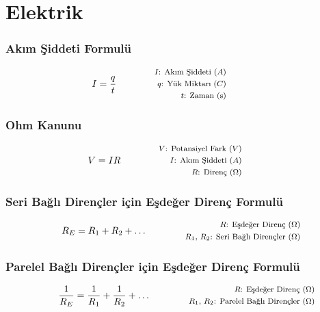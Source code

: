 \section{Elektrik}

\subsubsection*{Akım Şiddeti Formulü}
\begin{equation}
    I = \frac{q}{t} \qquad \qquad \parbox{4cm}{\footnotesize$\begin{aligned}
        I\text{: Akım Şiddeti } (A) \\
        q\text{: Yük Miktarı } (C) \\
        t\text{: Zaman (s)}
\end{aligned}$}
\end{equation}

\subsubsection*{Ohm Kanunu}
\begin{equation}
    V = IR \qquad \qquad \parbox{4cm}{\footnotesize$\begin{aligned}
        V\text{: Potansiyel Fark } (V) \\
        I\text{: Akım Şiddeti } (A) \\
        R\text{: Direnç } (\Omega)
\end{aligned}$}
\end{equation}

\subsubsection*{Seri Bağlı Dirençler için Eşdeğer Direnç Formulü}
\begin{equation}
    R_E = R_1 + R_2 + \dots \qquad \qquad \parbox{4cm}{\footnotesize$\begin{aligned}
        R\text{: Eşdeğer Direnç } (\Omega) \\
        R_1\text{, }R_2\text{: Seri Bağlı Dirençler } (\Omega)
\end{aligned}$}
\end{equation}

\subsubsection*{Parelel Bağlı Dirençler için Eşdeğer Direnç Formulü}
\begin{equation}
    \frac{1}{R_E} = \frac{1}{R_1} + \frac{1}{R_2} + \dots \qquad \qquad \parbox{4cm}{\footnotesize$\begin{aligned}
        R\text{: Eşdeğer Direnç } (\Omega) \\
        R_1\text{, }R_2\text{: Parelel Bağlı Dirençler } (\Omega)
\end{aligned}$}
\end{equation}
